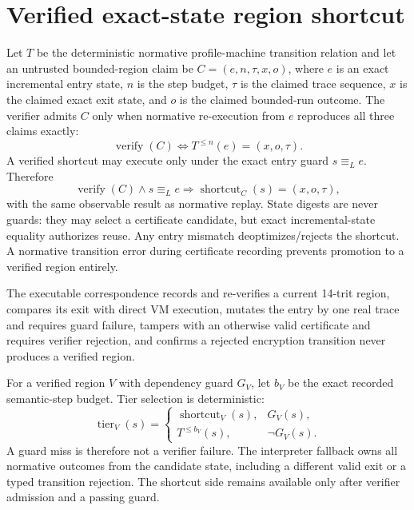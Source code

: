 \documentclass{article}
\begin{document}
\section{Verified exact-state region shortcut}

Let $T$ be the deterministic normative profile-machine transition relation and
let an untrusted bounded-region claim be
$C=(e,n,\tau,x,o)$, where $e$ is an exact incremental entry state, $n$ is the
step budget, $\tau$ is the claimed trace sequence, $x$ is the claimed exact exit
state, and $o$ is the claimed bounded-run outcome. The verifier admits $C$ only
when normative re-execution from $e$ reproduces all three claims exactly:
\begin{equation}
  \operatorname{verify}(C)
  \Longleftrightarrow
  T^{\leq n}(e)=(x,o,\tau).
  \label{eq:state-graph-exact-region-certificate}
\end{equation}
A verified shortcut may execute only under the exact entry guard
$s\equiv_L e$. Therefore
\[
  \operatorname{verify}(C)\land s\equiv_L e
  \Longrightarrow
  \operatorname{shortcut}_C(s)=(x,o,\tau),
\]
with the same observable result as normative replay. State digests are never
guards: they may select a certificate candidate, but exact incremental-state
equality authorizes reuse. Any entry mismatch deoptimizes/rejects the shortcut.
A normative transition error during certificate recording prevents promotion to a
verified region entirely.

The executable correspondence records and re-verifies a current 14-trit region,
compares its exit with direct VM execution, mutates the entry by one real trace
and requires guard failure, tampers with an otherwise valid certificate and
requires verifier rejection, and confirms a rejected encryption transition never
produces a verified region.

For a verified region $V$ with dependency guard $G_V$, let $b_V$ be the exact
recorded semantic-step budget. Tier selection is deterministic:
\begin{equation}
  \operatorname{tier}_V(s)=
  \begin{cases}
    \operatorname{shortcut}_V(s), & G_V(s),\\
    T^{\leq b_V}(s), & \neg G_V(s).
  \end{cases}
  \label{eq:state-graph-tiered-region-deopt}
\end{equation}
A guard miss is therefore not a verifier failure. The interpreter fallback owns
all normative outcomes from the candidate state, including a different valid
exit or a typed transition rejection. The shortcut side remains available only
after verifier admission and a passing guard.
\end{document}
